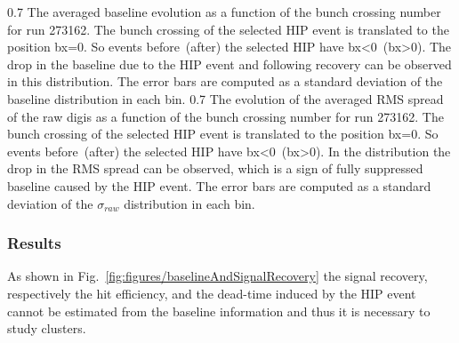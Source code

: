                  {0.7}       %
                 {The averaged baseline evolution as a function of the bunch crossing number for run 273162. The bunch crossing of the selected HIP event is translated to the position bx=0. So events before~(after) the selected HIP have bx<0~(bx>0). The drop in the baseline due to the HIP event and following recovery can be observed in this distribution. The error bars are computed as a standard deviation of the baseline distribution in each bin. } %
                 {0.7}       %
                 {The evolution of the averaged RMS spread of the raw digis as a function of the bunch crossing number for run 273162. The bunch crossing of the selected HIP event is translated to the position bx=0. So events before~(after) the selected HIP have bx<0~(bx>0). In the distribution the drop in the RMS spread can be observed, which is a sign of fully suppressed baseline caused by the HIP event. The error bars are computed as a standard deviation of the $\sigma_{raw}$ distribution in each bin.  } %

\subsubsection{Results}

As shown in Fig.~\ref{fig:figures/baselineAndSignalRecovery} the signal recovery, respectively the hit efficiency, and the dead-time induced by the HIP event cannot be estimated from the baseline information and thus it is necessary to study clusters.

